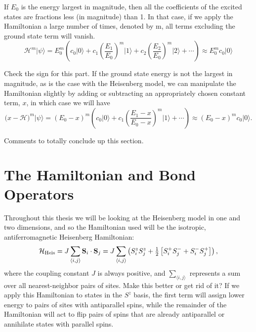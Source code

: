 If $E_0$ is the energy largest in magnitude, then all the coefficients
of the excited states are fractions less (in magnitude) than 1.  
In that case, if we apply the Hamiltonian a large number of times, denoted by m, all terms excluding
the ground state term will vanish.
\begin{equation}
\mathcal{H}^m\lvert \psi \rangle =
		E_0^m \left(c_0 \lvert 0 \rangle + 
		c_1 \left(\frac{E_1}{E_0}\right)^m \lvert 1 \rangle +
		c_2\left(\frac{ E_2}{E_0}\right)^m \lvert 2 \rangle + \cdots \right)
		\approx E_0^m c_0 \lvert 0 \rangle
\end{equation}

{\color{red} Check the sign for this part.}
If the ground state energy is not the largest in magnitude, as is the case with the Heisenberg
model, we can manipulate the Hamiltonian slightly by adding or subtracting an
appropriately chosen constant term, $x$, in which case we will have
\begin{equation}
(x-\mathcal{H)}^m\lvert \psi \rangle =
		(E_0-x)^m \left(c_0 \lvert 0 \rangle + 
		c_1 \left(\frac{E_1-x}{E_0-x}\right)^m \lvert 1 \rangle  + \cdots \right)
		\approx (E_0-x)^m c_0 \lvert 0 \rangle.
\end{equation}

{\color{red} Comments to totally conclude up this section.}


\section{The Hamiltonian and Bond Operators}

Throughout this thesis we will be looking at the Heisenberg model in one and two dimensions,
and so the Hamiltonian used will be the isotropic, antiferromagnetic Heisenberg 
Hamiltonian:
\begin{equation}
\mathcal{H}_{\rm{Heis}}=J\sum_{\langle i,j \rangle} \mathbf{S}_i\cdot \mathbf{S}_j
= J\sum_{\langle i,j \rangle}
	\left( S_i^z S_j^z + \tfrac{1}{2}\left[ S_i^+ S_j^- + S_i^- S_j^+ \right]\right),
\end{equation}
where the coupling constant $J$ is always positive, and $\sum_{\langle i,j \rangle}$ 
represents a sum over all nearest-neighbor pairs of sites.  
{\color{red} Make this better or get rid of it?}
If we apply this Hamiltonian to states in the $S^z$ basis, 
the first term will assign lower energy to pairs of sites with antiparallel spins,
while the remainder of the Hamiltonian will act to flip pairs of spins that are already 
antiparallel or annihilate states with parallel spins.

